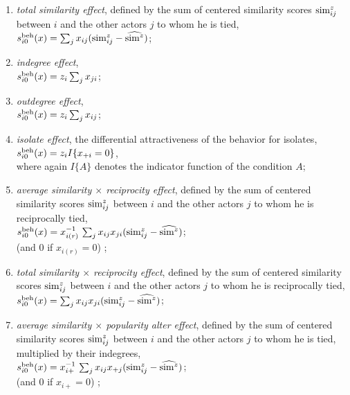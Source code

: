 \documentclass[a4paper,fleqn]{article}
\newcommand{\+}{\, + \,}
\newcommand{\vit}{\theenumi}
\begin{document}
{\begin{enumerate}
 \item {\em total similarity effect}, defined by the
 sum of centered similarity scores ${\rm sim}^z_{ij}$ between $i$
 and the other actors $j$ to whom he is tied,\\
 $s^{\rm beh}_{i\vit}(x) = \sum_j x_{ij} ({\rm sim}^z_{ij} - \widehat{{\rm sim}^z}) $;

 \item {\em indegree effect}, \\
 $s^{\rm beh}_{i\vit}(x) = z_i \sum_j x_{ji} $;

 \item {\em outdegree effect}, \\
 $s^{\rm beh}_{i\vit}(x) = z_i \sum_j x_{ij} $;


 \item {\em isolate effect}, the differential attractiveness of the behavior
  for isolates, \\
 $s^{\rm beh}_{i\vit}(x) = z_i I\{x_{+i} = 0 \}$,\\
 where again $I\{A\}$ denotes the indicator function of the condition $A$;


 \item
 {\em average similarity $\times$ reciprocity effect}, defined by the
 sum of centered similarity scores ${\rm sim}^z_{ij}$ between $i$
 and the other actors $j$ to whom he is reciprocally tied,\\
 $s^{\rm beh}_{i\vit}(x) = x_{i(r)}^{-1} \, \sum_j x_{ij} x_{ji} ({\rm sim}^z_{ij} - \widehat{{\rm sim}^z}) $;\\
 (and 0 if $x_{i(r)} = 0$) ;

 \item {\em total similarity $\times$ reciprocity effect}, defined by the
 sum of centered similarity scores ${\rm sim}^z_{ij}$ between $i$
 and the other actors $j$ to whom he is reciprocally tied,\\
 $s^{\rm beh}_{i\vit}(x) =  \sum_j x_{ij} x_{ji} ({\rm sim}^z_{ij} - \widehat{{\rm sim}^z}) $;

 \item {\em average similarity $\times$ popularity alter effect}, defined by the
 sum of centered similarity scores ${\rm sim}^z_{ij}$ between $i$
 and the other actors $j$ to whom he is  tied, multiplied by their indegrees, \\
 $s^{\rm beh}_{i\vit}(x) = x_{i+}^{-1} \, \sum_j x_{ij}  x_{+j} ({\rm sim}^z_{ij} - \widehat{{\rm sim}^z}) $;\\
 (and 0 if $x_{i+} = 0$) ;


\end{enumerate}}
\end{document}
